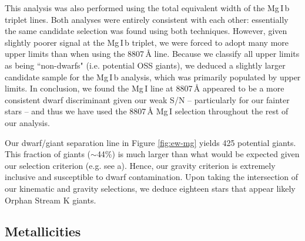 \documentclass[10pt,apjl]{emulateapj}
\begin{document}
This analysis was also performed using the total equivalent width of the Mg\,\textsc{I}\,b triplet lines. Both analyses were entirely consistent with each other: essentially the same candidate selection was found using both techniques. However, given slightly poorer signal at the Mg\,\textsc{I}\,b triplet, we were forced to adopt many more upper limits than when using the 8807\,{\AA} line. Because we classify all upper limits as being ``non-dwarfs" (i.e. potential OSS giants), we deduced a slightly larger candidate sample for the Mg\,\textsc{I}\,b analysis, which was primarily populated by upper limits. In conclusion, we found the Mg\,\textsc{I} line at 8807\,{\AA} appeared to be a more consistent dwarf discriminant given our weak S/N \--- particularly for our fainter stars \--- and thus we have used the 8807\,{\AA} Mg\,\textsc{I} selection throughout the rest of our analysis.

Our dwarf/giant separation line in Figure \ref{fig:ew-mg} yields 425 potential giants. This fraction of giants ($\sim$44\%) is much larger than what would be expected given our selection criterion (e.g. see \citeauthor{Casey_et-al_2012} \citeyear{Casey_et-al_2012}a). Hence, our gravity criterion is extremely inclusive and susceptible to dwarf contamination. Upon taking the intersection of our kinematic and gravity selections, we deduce eighteen stars that appear likely Orphan Stream K giants.


\subsection{Metallicities}
\label{sec:metallicities}
\end{document}
